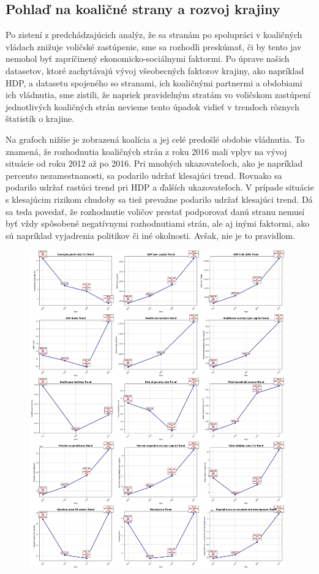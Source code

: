\documentclass[main.tex]{subfiles}
\begin{document}
\subsection{Pohlaď na koaličné strany a rozvoj krajiny}

Po zistení z predchádzajúcich analýz, že sa stranám po spolupráci v koaličných vládach znižuje voličské zastúpenie, sme sa rozhodli preskúmať, či by tento jav nemohol byť zapríčinený ekonomicko-sociálnymi faktormi.
Po úprave našich datasetov, ktoré zachytávajú vývoj všeobecných faktorov krajiny, ako napríklad HDP, a datasetu spojeného so stranami, ich koaličnými partnermi a obdobiami ich vládnutia, sme zistili, že napriek pravidelným stratám vo voličskom zastúpení jednotlivých koaličných strán nevieme tento úpadok vidieť v trendoch rôznych štatistík o krajine.

Na grafoch nižšie je zobrazená koalícia a jej celé predošlé obdobie vládnutia. To znamená, že rozhodnutia koaličných strán z roku 2016 mali vplyv na vývoj situácie od roku 2012 až po 2016. Pri mnohých ukazovateľoch, ako je napríklad percento nezamestnanosti, sa podarilo udržať klesajúci trend. Rovnako sa podarilo udržať rastúci trend pri HDP a ďalších ukazovateľoch. V prípade situácie s klesajúcim rizikom chudoby sa tiež prevažne podarilo udržať klesajúci trend. Dá sa teda povedať, že rozhodnutie voličov prestať podporovať danú stranu nemusí byť vždy spôsobené negatívnymi rozhodnutiami strán, ale aj inými faktormi, ako sú napríklad vyjadrenia politikov či iné okolnosti. Avšak, nie je to pravidlom.  

\begin{figure}[H]
	\centering
	\includegraphics[width=0.98\textwidth]
	{images_exploratory/Coalition_Progress.png}
	\caption{}
\end{figure}
\end{document}
